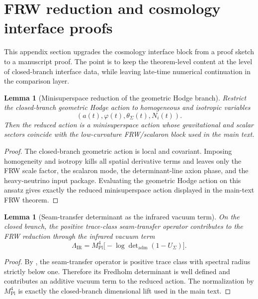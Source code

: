 \documentclass[11pt,a4paper]{article}
\newtheorem{lemma}[theorem]{Lemma}
\theoremstyle{definition}
\theoremstyle{remark}
\newcommand{\Mplunred}{M_{\mathrm{Pl}}}
\begin{document}
\section{FRW reduction and cosmology interface proofs}
\label{app:frw-interface-proofs}

This appendix section upgrades the cosmology interface block from a proof sketch to a manuscript
proof. The point is to keep the theorem-level content at the level of closed-branch interface data,
while leaving late-time numerical continuation in the comparison layer.

\begin{lemma}[Minisuperspace reduction of the geometric Hodge branch]
\label{lem:minisuperspace-reduction-hodge-branch}
Restrict the closed-branch geometric Hodge action to homogeneous and isotropic variables
\[
(a(t),\varphi(t),\theta_\Sigma(t),N_i(t)).
\]
Then the reduced action is a minisuperspace action whose gravitational and scalar sectors coincide
with the low-curvature FRW/scalaron block used in the main text.
\end{lemma}

\begin{proof}
The closed-branch geometric action is local and covariant. Imposing homogeneity and isotropy kills
all spatial derivative terms and leaves only the FRW scale factor, the scalaron mode, the
determinant-line axion phase, and the heavy-neutrino input package. Evaluating the geometric Hodge
action on this ansatz gives exactly the reduced minisuperspace action displayed in the main-text FRW
theorem.
\end{proof}

\begin{lemma}[Seam-transfer determinant as the infrared vacuum term]
\label{lem:seam-transfer-vacuum-term}
On the closed branch, the positive trace-class seam-transfer operator contributes to the FRW
reduction through the infrared vacuum term
\[
\Lambda_{\mathrm{IR}}
=
\Mplunred^4\bigl[-\log\det\nolimits_{\mathrm{adm}}(1-U_\Sigma)\bigr].
\]
\end{lemma}

\begin{proof}
By , the seam-transfer operator is positive trace class with spectral
radius strictly below one. Therefore its Fredholm determinant is well defined and contributes an
additive vacuum term to the reduced action. The normalization by $\Mplunred^4$ is exactly the
closed-branch dimensional lift used in the main text.
\end{proof}
\end{document}

